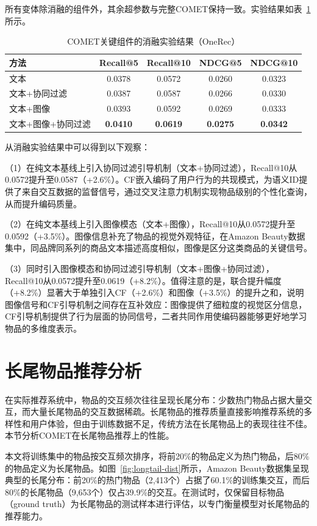 所有变体除消融的组件外，其余超参数与完整COMET保持一致。实验结果如表~\ref{tab:ablation-modality}所示。

\begin{table}[htbp]
  \centering
  \caption{COMET关键组件的消融实验结果（OneRec）}
  \label{tab:ablation-modality}
  \begin{tabular}{lcccc}
    \toprule
    方法 & Recall@5 & Recall@10 & NDCG@5 & NDCG@10 \\
    \midrule
    文本 & 0.0378 & 0.0572 & 0.0260 & 0.0323 \\
    文本+协同过滤 & 0.0387 & 0.0587 & 0.0266 & 0.0330 \\
    文本+图像 & 0.0393 & 0.0592 & 0.0269 & 0.0333 \\
    文本+图像+协同过滤 & \textbf{0.0410} & \textbf{0.0619} & \textbf{0.0275} & \textbf{0.0342} \\
    \bottomrule
  \end{tabular}
\end{table}

从消融实验结果中可以得到以下观察：

（1）在纯文本基线上引入协同过滤引导机制（文本+协同过滤），Recall@10从0.0572提升至0.0587（+2.6\%）。CF嵌入编码了用户行为的共现模式，为语义ID提供了来自交互数据的监督信号，通过交叉注意力机制实现物品级别的个性化查询，从而提升编码质量。

（2）在纯文本基线上引入图像模态（文本+图像），Recall@10从0.0572提升至0.0592（+3.5\%）。图像信息补充了物品的视觉外观特征，在Amazon Beauty数据集中，同品牌同系列的商品文本描述高度相似，图像是区分这类商品的关键信号。

（3）同时引入图像模态和协同过滤引导机制（文本+图像+协同过滤），Recall@10从0.0572提升至0.0619（+8.2\%）。值得注意的是，联合提升幅度（+8.2\%）显著大于单独引入CF（+2.6\%）和图像（+3.5\%）的提升之和，说明图像信号和CF引导机制之间存在互补效应：图像提供了细粒度的视觉区分信息，CF引导机制提供了行为层面的协同信号，二者共同作用使编码器能够更好地学习物品的多维度表示。

\section{长尾物品推荐分析}

在实际推荐系统中，物品的交互频次往往呈现长尾分布：少数热门物品占据大量交互，而大量长尾物品的交互数据稀疏。长尾物品的推荐质量直接影响推荐系统的多样性和用户体验，但由于训练数据不足，传统方法在长尾物品上的表现往往不佳。本节分析COMET在长尾物品推荐上的性能。

本文将训练集中的物品按交互频次排序，将前20\%的物品定义为热门物品，后80\%的物品定义为长尾物品。如图~\ref{fig:longtail-dist}所示，Amazon Beauty数据集呈现典型的长尾分布：前20\%的热门物品（2,413个）占据了60.1\%的训练集交互，而后80\%的长尾物品（9,653个）仅占39.9\%的交互。在测试时，仅保留目标物品（ground truth）为长尾物品的测试样本进行评估，以专门衡量模型对长尾物品的推荐能力。

